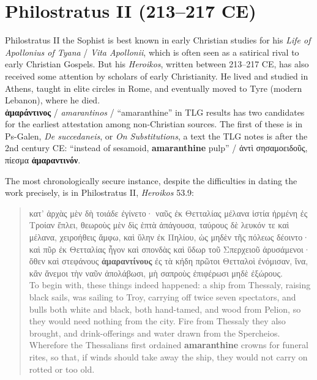 %
%
\chapter{Philostratus II (213--217 CE)}
\vspace*{3mm}%
\justifying%
%
\noindent{}Philostratus II the Sophist %
is best known in early Christian studies for his %
\textit{Life of Apollonius of Tyana} / \textit{Vita Apollonii}, %
which is often seen as a satirical rival to early Christian Gospels. %
But his \textit{Heroikos}, written between 213--217 CE, %
has also received some attention by scholars of early Christianity. 
He lived and studied in Athens, taught in elite circles in Rome, %
and eventually moved to Tyre (modern Lebanon), where he died. \\[1mm] %

\noindent{}\textbf{ἀμαράντινος} / \textit{amarantinos} / “amaranthine” in TLG results has two %
candidates for the earliest attestation among non-Christian sources. %
The first of these is in Ps-Galen, \textit{De succedaneis}, or \textit{On Substitutions}, %
a text the TLG notes is after the 2nd century CE: %
“instead of sesamoid, \textbf{amaranthine} pulp” / ἀντὶ σησαμοειδοῦς, πίεσμα \textbf{ἀμαραντινόν}.

The most chronologically secure instance, despite the difficulties in dating the work precisely, %
is in Philostratus II, \textit{Heroikos} 53.9: %

\vspace*{3mm} 
 \begin{quote}κατ’ ἀρχὰς μὲν δὴ τοιάδε ἐγίνετο· %
 ναῦς ἐκ Θετταλίας μέλανα ἱστία ἠρμένη ἐς Τροίαν ἔπλει, %
 θεωροὺς μὲν δὶς ἑπτὰ ἀπάγουσα, ταύρους δὲ λευκόν τε καὶ μέλανα, %
 χειροήθεις ἄμφω, καὶ ὕλην ἐκ Πηλίου, %
 ὡς μηδὲν τῆς πόλεως δέοιντο· %
 καὶ πῦρ ἐκ Θετταλίας ἦγον καὶ σπονδὰς καὶ ὕδωρ τοῦ Σπερχειοῦ ἀρυσάμενοι· %
 ὅθεν καὶ στεφάνους \textbf{ἀμαραντίνους} ἐς τὰ κήδη πρῶτοι Θετταλοὶ ἐνόμισαν, %
 ἵνα, κἂν ἄνεμοι τὴν ναῦν ἀπολάβωσι, μὴ σαπροὺς ἐπιφέρωσι μηδὲ ἐξώρους. \\[1mm] %
 To begin with, these things indeed happened: %
 a ship from Thessaly, raising black sails, was sailing to Troy, %
 carrying off twice seven spectators, and bulls both white and black, %
 both hand-tamed, and wood from Pelion, %
 so they would need nothing from the city. %
 Fire from Thessaly they also brought, and drink-offerings and %
 water drawn from the Spercheios. %
 Wherefore the Thessalians first ordained \textbf{amaranthine} crowns for funeral rites, %
 so that, if winds should take away the ship, they would not carry on rotted or too old. %
\end{quote} %
\vspace*{3mm}

